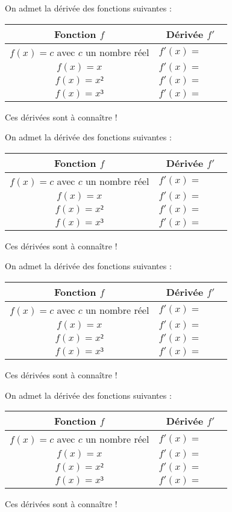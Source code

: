 \documentclass[
	noheader
]{coursclass}
\begin{document}
\newcommand{\Fonctions}{
	\begin{greybox}[frametitle={Fonctions de référence}]
		On admet la dérivée des fonctions suivantes :

		\renewcommand{\arraystretch}{1.6}
		\begin{center}
			\begin{tabular}{|c|c|}
				\hline
				Fonction $f$                       & Dérivée $f'$             \\ \hline
				$f(x) = c$ avec $c$ un nombre réel & $f'(x) = \phantom{aaaa}$ \\ \hline
				$f(x) = x$                         & $f'(x) = \phantom{aaaa}$ \\ \hline
				$f(x) = x²$                        & $f'(x) = \phantom{aaaa}$ \\ \hline
				$f(x) = x³$                        & $f'(x) = \phantom{aaaa}$ \\ \hline
			\end{tabular}
		\end{center}

		Ces dérivées sont à connaître !
	\end{greybox}
}

\Fonctions

\Fonctions

\Fonctions

\Fonctions
\end{document}
